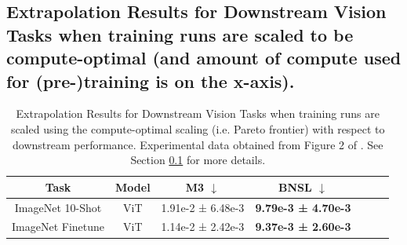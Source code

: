 \documentclass{article} %
\newcommand{\highlight}[1]{\colorbox{blue!10}{#1}}
\begin{document}
\clearpage

\subsection{Extrapolation Results for Downstream Vision Tasks when training runs are scaled to be compute-optimal (and amount of compute used for (pre-)training is on the x-axis).}
\label{section:vision_tasks__compute_optimal}

\vspace{-3.5mm}

\begin{table}[hbt!]
    \centering
    \begin{tabular}{ |cc|c|c|c|c|c| } 
\hline
Task & Model & M3 $\downarrow$ & BNSL $\downarrow$\\
 \hline
 
 ImageNet 10-Shot & ViT & 1.91e-2 ± 6.48e-3 & \bfseries 9.79e-3 ± 4.70e-3\\
 ImageNet Finetune & ViT & 1.14e-2 ± 2.42e-3 & \bfseries 9.37e-3 ± 2.60e-3 \\
 \hline
\end{tabular}
    \caption{
    Extrapolation Results for Downstream Vision Tasks when training runs are scaled using the compute-optimal scaling (i.e. Pareto frontier) with respect to downstream performance. Experimental data obtained from Figure 2 of \cite{DBLP:journals/corr/abs-2106-04560}. See Section \ref{section:vision_tasks__compute_optimal} for more details.
    }
    \label{table:vision_compute_scaling}
\end{table}

\FloatBarrier
\end{document}
